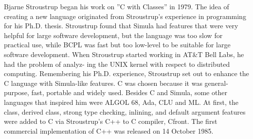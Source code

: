 \noindent Bjarne Stroustrup began his work on ”C with Classes” in 1979. The idea of creating a new language
originated from Stroustrup’s experience in programming for his Ph.D. thesis. Stroustrup found that
Simula had features that were very helpful for large software development, but the language was
too slow for practical use, while BCPL was fast but too low-level to be suitable for large software
development. When Stroustrup started working in AT\&T Bell Labs, he had the problem of analyz-
ing the UNIX kernel with respect to distributed computing. Remembering his Ph.D. experience,
Stroustrup set out to enhance the C language with Simula-like features. C was chosen because it
was general-purpose, fast, portable and widely used. Besides C and Simula, some other languages
that inspired him were ALGOL 68, Ada, CLU and ML. At first, the class, derived class, strong
type checking, inlining, and default argument features were added to C via Stroustrup’s C++ to C
compiler, Cfront. The first commercial implementation of C++ was released on 14 October 1985.\\

